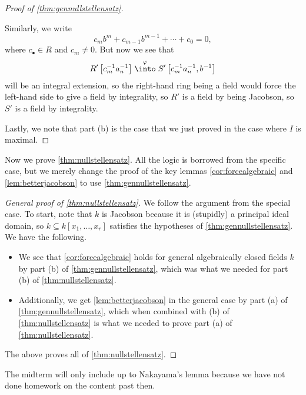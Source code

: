 \begin{proof}[Proof of \autoref{thm:gennullstellensatz}]
\begin{itemize}
		Similarly, we write
		\[c_mb^m+c_{m-1}b^{m-1}+\cdots+c_0=0,\]
		where $c_\bullet\in R$ and $c_m\ne0$. But now we see that
		\[R'\left[c_m^{-1}a_n^{-1}\right]\stackrel\varphi\into S'\left[c_m^{-1}a_n^{-1},b^{-1}\right]\]
		will be an integral extension, so the right-hand ring being a field would force the left-hand side to give a field by integrality, so $R'$ is a field by being Jacobson, so $S'$ is a field by integrality.
	\end{itemize}
	Lastly, we note that part (b) is the case that we just proved in the case where $I$ is maximal.
\end{proof}
\noindent Now we prove \autoref{thm:nullstellensatz}. All the logic is borrowed from the specific case, but we merely change the proof of the key lemmas \autoref{cor:forcealgebraic} and \autoref{lem:betterjacobson} to use \autoref{thm:gennullstellensatz}.
\begin{proof}[General proof of \autoref{thm:nullstellensatz}]
	We follow the argument from the special case. To start, note that $k$ is Jacobson because it is (stupidly) a principal ideal domain, so $k\subseteq k[x_1,\ldots,x_r]$ satisfies the hypotheses of \autoref{thm:gennullstellensatz}. We have the following.
	\begin{itemize}
		\item We see that \autoref{cor:forcealgebraic} holds for general algebraically closed fields $k$ by part (b) of \autoref{thm:gennullstellensatz}, which was what we needed for part (b) of \autoref{thm:nullstellensatz}.
		\item Additionally, we get \autoref{lem:betterjacobson} in the general case by part (a) of \autoref{thm:gennullstellensatz}, which when combined with (b) of \autoref{thm:nullstellensatz} is what we needed to prove part (a) of \autoref{thm:nullstellensatz}.
	\end{itemize}
	The above proves all of \autoref{thm:nullstellensatz}.
\end{proof}
\begin{remark}
	The midterm will only include up to Nakayama's lemma because we have not done homework on the content past then.
\end{remark}

